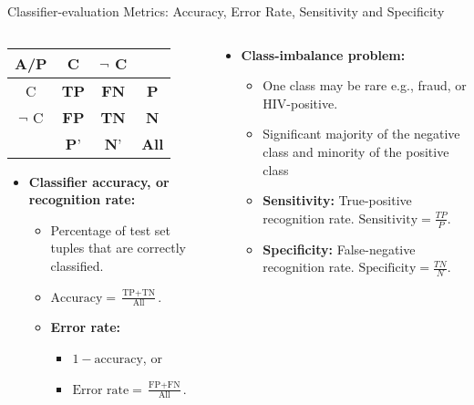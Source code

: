 \begin{frame}{Classifier-evaluation Metrics: Accuracy, Error Rate, Sensitivity and Specificity}
	\begin{columns}
		\begin{column}{0.5\textwidth}
			\centering
			\begin{tabular}{|c|c|c|c|}
				\hline
				A/P      & C           & $\neg$ C    &              \\\hline
				C        & \textbf{TP} & \textbf{FN} & \textbf{P}   \\\hline
				$\neg$ C & \textbf{FP} & \textbf{TN} & \textbf{N}   \\\hline
				         & \textbf{P}' & \textbf{N}' & \textbf{All} \\\hline
			\end{tabular}
			\begin{itemize}
				\item \textbf{Classifier accuracy, or recognition rate:}
				      \begin{itemize}
					      \item Percentage of test set tuples that are correctly classified.
					      \item $\text{Accuracy} = \frac{\text{TP} + \text{TN}}{\text{All}}.$
					      \item \textbf{Error rate:}
					            \begin{itemize}
						            \item $1-\text{accuracy}$, or
						            \item $\text{Error rate} = \frac{\text{FP}+\text{FN}}{\text{All}}.$
					            \end{itemize}
				      \end{itemize}
			\end{itemize}
		\end{column}
		\begin{column}{0.5\textwidth}
			\begin{itemize}
				\item \textbf{Class-imbalance problem:}
				      \begin{itemize}
					      \item One class may be rare e.g., fraud, or HIV-positive.
					      \item Significant majority of the negative class and minority of the positive class
					      \item \textbf{Sensitivity:} True-positive recognition rate. $\text{Sensitivity} = \frac{TP}{P}$.
					      \item \textbf{Specificity:} False-negative recognition rate. $\text{Specificity} = \frac{TN}{N}$.
				      \end{itemize}
			\end{itemize}
		\end{column}
	\end{columns}
\end{frame}

